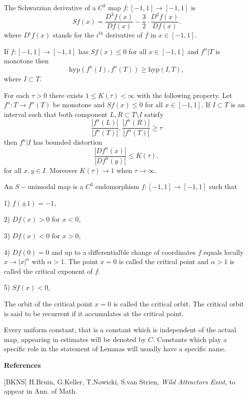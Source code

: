 \flushpar
The Schwarzian derivative of a $C^3$ map $f:[-1,1]\to [-1,1]$ is
$$
Sf(x)=\frac{D^3f(x)}{Df(x)}-\frac32\cdot\frac{D^2f(x)}{Df(x)}.
$$
where $D^if(x)$ stands for the $i^{th}$ derivative of $f$ in $x\in [-1,1]$.

 If $f:[-1,1]\to [-1,1]$ has $Sf(x)\le 0$ for all
$x\in [-1,1]$ and $f^n|T$ is monotone then
$$
\text{hyp}(f^n(I),f^n(T))\ge \text{hyp}(I,T),
$$
where $I\subset T$.
\endproclaim

 For each $\tau>0$ there exists 
$1\le K(\tau)<\infty$ with the following property. 
Let $f^n:T\to f^n(T)$ be monotone and $Sf(x)\le 0$
for all $x\in [-1,1]$. If $I\subset T$ is an interval such that both component
$L,R\subset T\setminus I$ satisfy
$$
\frac{|f^n(L)|}{|f^n(T)|},\frac{|f^n(R)|}{|f^n(T)|}\ge \tau
$$
then $f^n|I$ has bounded distortion
$$
\frac{|Df^n(x)|}{|Df^n(y)|}\le K(\tau),
$$
for all $x,y\in I$.
Moreover $K(\tau)\to 1$ when $\tau\to \infty$.
\endproclaim

\flushpar
An $S-$unimodal map is a $C^3$ endomorphism $f:[-1,1]\to [-1,1]$ such that

\parindent=15pt
\item{1)} $f(\pm1)=-1$,
\item{2)} $Df(x)>0$ for $x<0$,
\item{3)} $Df(x)<0$ for $x>0$,
\item{4)} $Df(0)=0$ and up to a differentialble change of coordinates
$f$ equals locally $x\to |x|^{\alpha}$ with $\alpha>1$. 
The point $x=0$ is called the critical point and $\alpha>1$ is called the
critical exponent of $f$. 
\item{5)} $Sf(x)<0$,

\flushpar
The orbit of the critical point $x=0$ is called the critical orbit. The 
critical orbit is said to be recurrent if it accumulates at the critical 
point.

\bigskip

\flushpar
{} Every uniform constant, that is a constant which
is independent of the actual map, appearing in estimates will be denoted by 
$C$. Constants which play a specific role in the statement of Lemmas will
usually have a specific name.
\enddemo\bigskip
\centerline{\bf References}
\bigskip

\parindent=25pt
\item{[BKNS]} H.Bruin, G.Keller, T.Nowicki, S.van Strien, {\it Wild
            Attractors Exist}, to appear in Ann. of Math.

